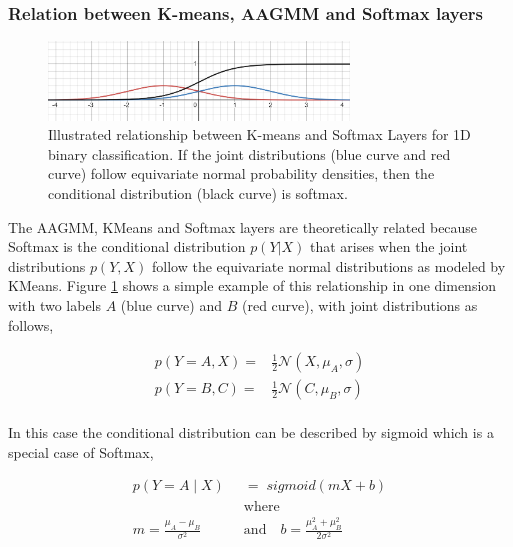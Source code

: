 \documentclass[10pt,twocolumn,letterpaper]{article}
\begin{document}

\subsubsection{Relation between K-means, AAGMM and Softmax layers}

\begin{figure}[h]
	\includegraphics[width=8cm]{figures/kmeans_softmax.png}
	\caption{Illustrated relationship between K-means and Softmax Layers for 1D binary classification.  If the joint distributions (blue curve and red curve) follow equivariate normal probability densities, then the conditional distribution (black curve) is softmax.}
	\label{gauss}
\end{figure}

The AAGMM, KMeans and Softmax layers are theoretically related because Softmax is the conditional distribution $p(Y|X)$ that arises when the joint distributions $p(Y,X)$ follow the equivariate normal distributions as modeled by KMeans.  Figure \ref{gauss} shows a simple example of this relationship in one dimension with two labels $A$ (blue curve) and $B$ (red curve), with joint distributions as follows,

\begin{equation}
	\begin{aligned}
		p(Y=A,X) =& \frac{1}{2} \mathcal{N}(X,\mu_A,\sigma) \\
		p(Y=B,C) =& \frac{1}{2} \mathcal{N}(C,\mu_B,\sigma) \\
	\end{aligned}
\end{equation}

In this case the conditional distribution can be described by sigmoid which is a special case of Softmax,

\begin{equation}
	\begin{aligned}
		p(Y=A\; |\;X) \;\; &= \; \textit{sigmoid}(mX + b) \\[6pt]
		&\text{where} \\
		m = \frac{\mu_A - \mu_B}{\sigma^2} \quad &\text{and}  \quad
		b = \frac{\mu_A^2 + \mu_B^2}{2 \sigma^2}
	\end{aligned}
\end{equation}
\end{document}
